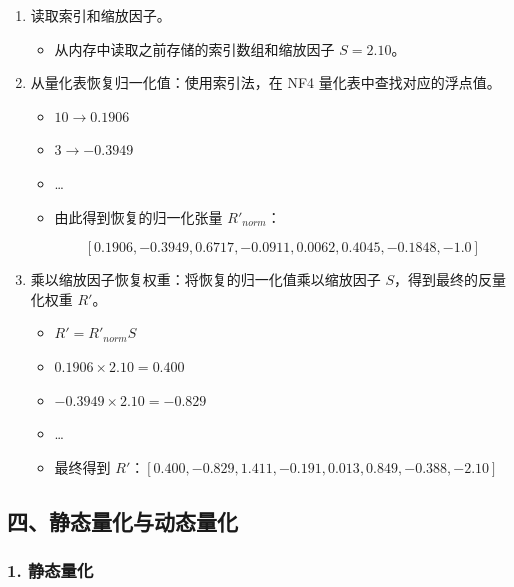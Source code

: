 \begin{enumerate}
\def\labelenumi{\arabic{enumi}.}
\item
  读取索引和缩放因子。

  \begin{itemize}
  \tightlist
  \item
    从内存中读取之前存储的索引数组和缩放因子 \(S = 2.10\)。
  \end{itemize}
\item
  从量化表恢复归一化值：使用索引法，在 NF4 量化表中查找对应的浮点值。

  \begin{itemize}
  \tightlist
  \item
    \(10 \to 0.1906\)
  \item
    \(3 \to -0.3949\)
  \item
    \ldots{}
  \item
{}
    由此得到恢复的归一化张量 \(R'_{norm}\)：

\[
[0.1906, -0.3949, 0.6717, -0.0911, 0.0062, 0.4045, -0.1848, -1.0]
\]
  \end{itemize}
\item
  乘以缩放因子恢复权重：将恢复的归一化值乘以缩放因子 \(S\)，得到最终的反量化权重 \(R'\)。

  \begin{itemize}
  \tightlist
  \item
    \(R' = R'_{norm}S\)
  \item
    \(0.1906 \times 2.10 = 0.400\)
  \item
    \(-0.3949 \times 2.10 = -0.829\)
  \item
    \ldots{}
  \item
    最终得到 \(R'\)：\([0.400, -0.829, 1.411, -0.191, 0.013, 0.849, -0.388, -2.10]\)
  \end{itemize}
\end{enumerate}

\hypertarget{ux56dbux9759ux6001ux91cfux5316ux4e0eux52a8ux6001ux91cfux5316}{%
\subsection{四、静态量化与动态量化}\label{ux56dbux9759ux6001ux91cfux5316ux4e0eux52a8ux6001ux91cfux5316}}

\hypertarget{ux9759ux6001ux91cfux5316}{%
\subsubsection{1. 静态量化}\label{ux9759ux6001ux91cfux5316}}

